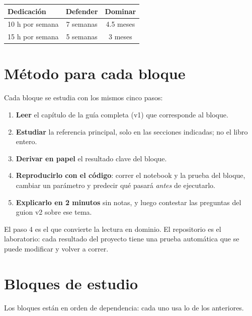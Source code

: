 \documentclass[11pt,a4paper,oneside]{article}
\begin{document}
\begin{center}
\begin{tabular}{lcc}
\toprule
\textbf{Dedicación} & \textbf{Defender} & \textbf{Dominar} \\
\midrule
10 h por semana & 7 semanas & 4.5 meses \\
15 h por semana & 5 semanas & 3 meses \\
\bottomrule
\end{tabular}
\end{center}

\section{Método para cada bloque}

Cada bloque se estudia con los mismos cinco pasos:

\begin{enumerate}
\item \textbf{Leer} el capítulo de la guía completa (v1) que corresponde al bloque.
\item \textbf{Estudiar} la referencia principal, solo en las secciones indicadas; no el
libro entero.
\item \textbf{Derivar en papel} el resultado clave del bloque.
\item \textbf{Reproducirlo con el código}: correr el notebook y la prueba del bloque,
cambiar un parámetro y predecir qué pasará \emph{antes} de ejecutarlo.
\item \textbf{Explicarlo en 2 minutos} sin notas, y luego contestar las preguntas del
guion v2 sobre ese tema.
\end{enumerate}

\begin{nota}
El paso 4 es el que convierte la lectura en dominio. El repositorio es el laboratorio:
cada resultado del proyecto tiene una prueba automática que se puede modificar y volver a
correr.
\end{nota}

\section{Bloques de estudio}

Los bloques están en orden de dependencia: cada uno usa lo de los anteriores.
\end{document}
